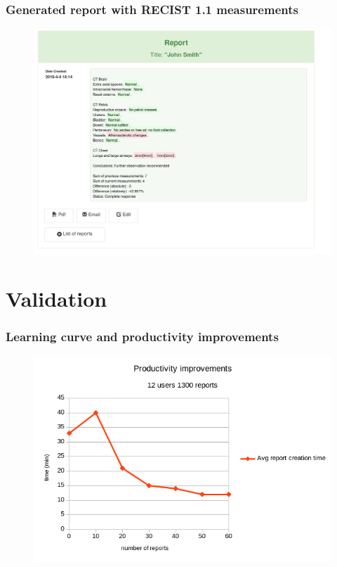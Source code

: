 \documentclass{beamer}
\begin{document}
\begin{frame}
\frametitle{Generated report with RECIST 1.1 measurements}
\begin{figure}
	\centering
	\includegraphics[width=1\linewidth]{../report-copy-to-clipboard}
	\label{fig:report-copy-to-clipboard}
\end{figure}
\end{frame}

\section {Validation}

\begin{frame}
\frametitle{Learning curve and productivity improvements}
\begin{figure}
	\centering
	\includegraphics[width=1\linewidth]{productivity_improvements_chart}
\end{figure}
\end{frame}
\end{document}
